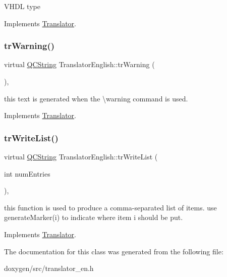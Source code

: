 V\+H\+DL type 

Implements \mbox{\hyperlink{class_translator}{Translator}}.

\mbox{\label{class_translator_english_aee4cb3b5ee1fc5db35cfe8e2f5d9bb24}} 
\subsubsection{\texorpdfstring{trWarning()}{trWarning()}}
{\footnotesize\ttfamily virtual \mbox{\hyperlink{class_q_c_string}{Q\+C\+String}} Translator\+English\+::tr\+Warning (\begin{DoxyParamCaption}{ }\end{DoxyParamCaption})\hspace{0.3cm}{\ttfamily [inline]}, {\ttfamily [virtual]}}

this text is generated when the \textbackslash{}warning command is used. 

Implements \mbox{\hyperlink{class_translator}{Translator}}.

\mbox{\label{class_translator_english_a1f7d6657b8b2abc3ddcbc67a27f94fe0}} 
\subsubsection{\texorpdfstring{trWriteList()}{trWriteList()}}
{\footnotesize\ttfamily virtual \mbox{\hyperlink{class_q_c_string}{Q\+C\+String}} Translator\+English\+::tr\+Write\+List (\begin{DoxyParamCaption}\item[{int}]{num\+Entries }\end{DoxyParamCaption})\hspace{0.3cm}{\ttfamily [inline]}, {\ttfamily [virtual]}}

this function is used to produce a comma-\/separated list of items. use generate\+Marker(i) to indicate where item i should be put. 

Implements \mbox{\hyperlink{class_translator}{Translator}}.



The documentation for this class was generated from the following file\+:\begin{DoxyCompactItemize}
\item 
doxygen/src/translator\+\_\+en.\+h\end{DoxyCompactItemize}
